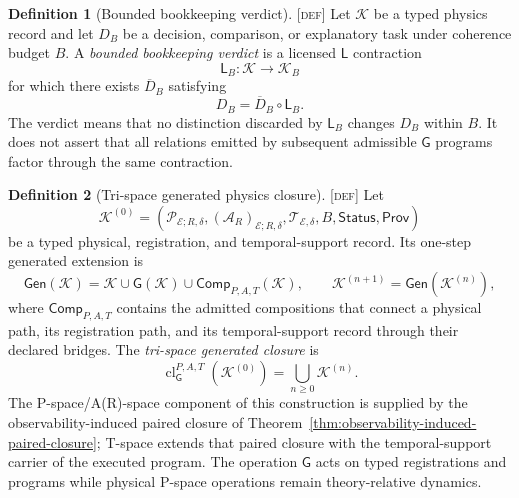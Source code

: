 \documentclass[11pt]{article}
\newcommand{\Pspace}{\ensuremath{\mathcal{P}}}
\newcommand{\ARspace}{\ensuremath{\mathcal{A}_{R}}}
\newcommand{\Tspace}{\ensuremath{\mathcal{T}}}
\newcommand{\GOp}{\ensuremath{\mathsf{G}}}
\newcommand{\LOp}{\ensuremath{\mathsf{L}}}
\newcommand{\Comp}{\ensuremath{\mathsf{Comp}}}
\newcommand{\Defn}{\textsc{[def]}}
\theoremstyle{definition}
\newtheorem{sdefinition}{Definition}
\begin{document}
\begin{sdefinition}[Bounded bookkeeping verdict]
\label{def:bounded-bookkeeping}
\Defn{} Let $\mathcal K$ be a typed physics record and let $D_B$ be a decision,
comparison, or explanatory task under coherence budget $B$. A \emph{bounded
bookkeeping verdict} is a licensed $\LOp$ contraction
\begin{equation}
\LOp_B:\mathcal K\longrightarrow\mathcal K_B
\label{eq:bounded-bookkeeping-contraction}
\end{equation}
for which there exists $\overline D_B$ satisfying
\begin{equation}
D_B=\overline D_B\circ\LOp_B.
\label{eq:bounded-bookkeeping-factorization}
\end{equation}
The verdict means that no distinction discarded by $\LOp_B$ changes $D_B$ within
$B$. It does not assert that all relations emitted by subsequent admissible
$\GOp$ programs factor through the same contraction.
\end{sdefinition}

\begin{sdefinition}[Tri-space generated physics closure]
\label{def:tri-space-generated-closure}
\Defn{} Let
\begin{equation}
\mathcal K^{(0)}=
\left(
\Pspace_{\mathcal E;R,\delta},
(\ARspace)_{\mathcal E;R,\delta},
\Tspace_{\mathcal E,\delta},B,\mathsf{Status},\mathsf{Prov}
\right)
\label{eq:tri-space-seed}
\end{equation}
be a typed physical, registration, and temporal-support record. Its one-step
generated extension is
\begin{equation}
\mathsf{Gen}(\mathcal K)=
\mathcal K\cup\GOp(\mathcal K)\cup\Comp_{P,A,T}(\mathcal K),
\qquad
\mathcal K^{(n+1)}=\mathsf{Gen}(\mathcal K^{(n)}),
\label{eq:tri-space-generation}
\end{equation}
where $\Comp_{P,A,T}$ contains the admitted compositions that connect a physical
path, its registration path, and its temporal-support record through their
declared bridges. The \emph{tri-space generated closure} is
\begin{equation}
\operatorname{cl}_{\GOp}^{P,A,T}(\mathcal K^{(0)})=
\bigcup_{n\geq 0}\mathcal K^{(n)}.
\label{eq:tri-space-generated-closure}
\end{equation}
The P-space/A(R)-space component of this construction is supplied by the
observability-induced paired closure of
Theorem~\ref{thm:observability-induced-paired-closure}; T-space extends that paired
closure with the temporal-support carrier of the executed program. The operation
$\GOp$ acts on typed registrations and programs while physical P-space operations
remain theory-relative dynamics.
\end{sdefinition}
\end{document}
